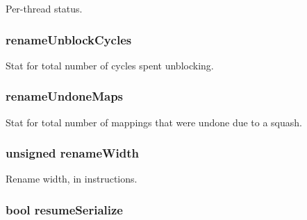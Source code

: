 \label{classDefaultRename_a8c157bf422205d3cdd7e7c75c2592b6f}
Per-\/thread status. \hypertarget{classDefaultRename_a2f14c493f619ee24a84fbe959ed72a97}{
\subsubsection[{renameUnblockCycles}]{ {\bf renameUnblockCycles}}}
\label{classDefaultRename_a2f14c493f619ee24a84fbe959ed72a97}
Stat for total number of cycles spent unblocking. \hypertarget{classDefaultRename_ae0c8395975c577671916d55df6e05b16}{
\subsubsection[{renameUndoneMaps}]{ {\bf renameUndoneMaps}}}
\label{classDefaultRename_ae0c8395975c577671916d55df6e05b16}
Stat for total number of mappings that were undone due to a squash. \hypertarget{classDefaultRename_a4b41704382bddb6ee06b5ce97b47dd7b}{
\subsubsection[{renameWidth}]{\setlength{\rightskip}{0pt plus 5cm}unsigned {\bf renameWidth}}}
\label{classDefaultRename_a4b41704382bddb6ee06b5ce97b47dd7b}
Rename width, in instructions. \hypertarget{classDefaultRename_afa9ffeefc4b3ff8ae1ea9919bedbd1e4}{
\subsubsection[{resumeSerialize}]{\setlength{\rightskip}{0pt plus 5cm}bool {\bf resumeSerialize}}}
